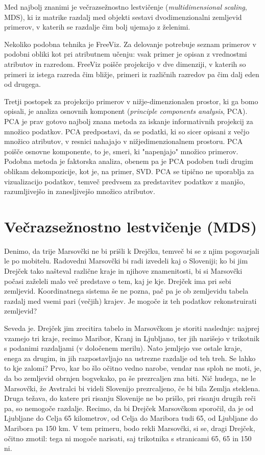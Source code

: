 Med najbolj znanimi je večrazsežnostno lestvičenje ({\em multidimensional scaling}, MDS), ki iz matrike razdalj med objekti sestavi dvodimenzionalni zemljevid primerov, v katerih se razdalje čim bolj ujemajo z želenimi.

Nekoliko podobna tehnika je FreeViz. Za delovanje potrebuje seznam primerov v podobni obliki kot pri atributnem učenju: vsak primer je opisan z vrednostmi atributov in razredom. FreeViz poišče projekcijo v dve dimenziji, v katerih so primeri iz istega razreda čim bližje, primeri iz različnih razredov pa čim dalj eden od drugega.

Tretji postopek za projekcijo primerov v nižje-dimenzionalen prostor, ki ga bomo opisali, je analiza osnovnih komponent ({\em principle components analysis}, PCA). PCA je prav gotovo najbolj znana metoda za iskanje informativnih projekcij za množico podatkov. PCA  predpostavi, da se podatki, ki so sicer opisani z večjo množico atributov, v resnici nahajajo v nižjedimenzionalnem prostoru. PCA poišče osnovne komponente, to je, smeri, ki "napenjajo" množico primerov. Podobna metoda je faktorska analiza, obenem pa je PCA podoben tudi drugim oblikam dekompozicije, kot je, na primer, SVD. PCA se tipično ne uporablja za vizualizacijo podatkov, temveč predvsem za predstavitev podatkov z manjšo, razumljivejšo in zanesljivejšo množico atributov.

\section{Večrazsežnostno lestvičenje (MDS)}

Denimo, da trije Marsovčki ne bi prišli k Drejčku, temveč bi se z njim pogovarjali le po mobitelu. Radovedni Marsovčki bi radi izvedeli kaj o Sloveniji; ko bi jim Drejček tako našteval različne kraje in njihove znamenitosti, bi si Marsovčki počasi zaželeli malo več predstave o tem, kaj je kje. Drejček ima pri sebi zemljevid. Koordinatnega sistema še ne pozna, pač pa je ob zemljevidu tabela razdalj med vsemi pari (večjih) krajev. Je mogoče iz teh podatkov rekonstruirati zemljevid?

Seveda je. Drejček jim zrecitira tabelo in Marsovčkom je storiti naslednje: najprej vzamejo tri kraje, recimo Maribor, Kranj in Ljubljano, ter jih narišejo v trikotnik s podanimi razdaljami (v določenem merilu). Nato jemljejo vse ostale kraje, enega za drugim, in jih razpostavljajo na ustrezne razdalje od teh treh. Se lahko to kje zalomi? Prvo, kar bo šlo očitno vedno narobe, vendar nas sploh ne moti, je, da bo zemljevid obrnjen bogvekako, pa še prezrcaljen zna biti. Nič hudega, ne le Marsovčki, že Avstralci bi videli Slovenijo prezrcaljeno, če bi bila Zemlja steklena. Druga težava, do katere pri risanju Slovenije ne bo prišlo, pri risanju drugih reči pa, so nemogoče razdalje. Recimo, da bi Drejček Marsovčkom sporočil, da je od Ljubljane do Celja 65 kilometrov, od Celja do Maribora tudi 65, od Ljubljane do Maribora pa 150 km. V tem primeru, bodo rekli Marsovčki, si se, dragi Drejček, očitno zmotil: tega ni mogoče narisati, saj trikotnika s stranicami 65, 65 in 150 ni.

